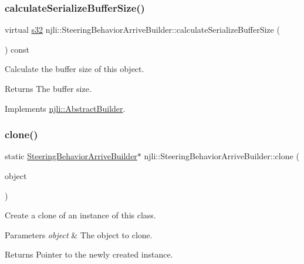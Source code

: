 \subsubsection{\texorpdfstring{calculate\+Serialize\+Buffer\+Size()}{calculateSerializeBufferSize()}}
{\footnotesize\ttfamily virtual \mbox{\hyperlink{_util_8h_aa62c75d314a0d1f37f79c4b73b2292e2}{s32}} njli\+::\+Steering\+Behavior\+Arrive\+Builder\+::calculate\+Serialize\+Buffer\+Size (\begin{DoxyParamCaption}{ }\end{DoxyParamCaption}) const\hspace{0.3cm}{\ttfamily [virtual]}}

Calculate the buffer size of this object.

\begin{DoxyReturn}{Returns}
The buffer size. 
\end{DoxyReturn}


Implements \mbox{\hyperlink{classnjli_1_1_abstract_builder_aa1d220053e182c37b31b427499c6eacf}{njli\+::\+Abstract\+Builder}}.

\mbox{\label{classnjli_1_1_steering_behavior_arrive_builder_ae7e3789fe4109faaa52ce84f2fcf6888}} 
\subsubsection{\texorpdfstring{clone()}{clone()}}
{\footnotesize\ttfamily static \mbox{\hyperlink{classnjli_1_1_steering_behavior_arrive_builder}{Steering\+Behavior\+Arrive\+Builder}}$\ast$ njli\+::\+Steering\+Behavior\+Arrive\+Builder\+::clone (\begin{DoxyParamCaption}\item[{const \mbox{\hyperlink{classnjli_1_1_steering_behavior_arrive_builder}{Steering\+Behavior\+Arrive\+Builder}} \&}]{object }\end{DoxyParamCaption})\hspace{0.3cm}{\ttfamily [static]}}

Create a clone of an instance of this class.


\begin{DoxyParams}{Parameters}
{\em object} & The object to clone.\\
\hline
\end{DoxyParams}
\begin{DoxyReturn}{Returns}
Pointer to the newly created instance. 
\end{DoxyReturn}
\mbox{\label{classnjli_1_1_steering_behavior_arrive_builder_af00ed16ecc1b1bb202e3d787ad00c5c4}} 
